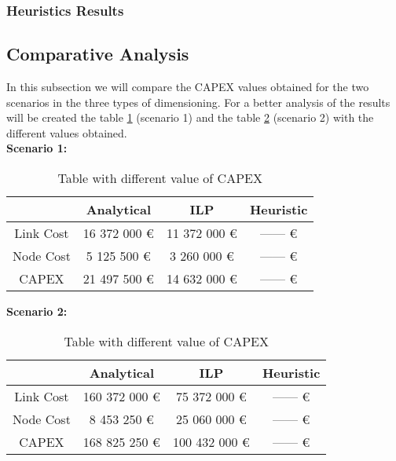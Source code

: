 \subsubsection{Heuristics Results}

\subsection{Comparative Analysis}

In this subsection we will compare the CAPEX values obtained for the two scenarios in the three types of dimensioning. For a better analysis of the results will be created the table \ref{table_comparative_opaque_sur_ref_1} (scenario 1) and the table \ref{table_comparative_opaque_sur_ref_2} (scenario 2) with the different values obtained.\\

\textbf{Scenario 1:}

\begin{table}[h!]
\centering
\begin{tabular}{| c | c | c | c |}
 \hline
   & Analytical & ILP & Heuristic \\
 \hline\hline
 Link Cost & 16 372 000 \euro & 11 372 000 \euro & ------ \euro \\
 Node Cost & 5 125 500 \euro & 3 260 000 \euro & ------ \euro \\
 CAPEX & 21 497 500 \euro & 14 632 000 \euro & ------ \euro \\
 \hline
\end{tabular}
\caption{Table with different value of CAPEX }
\label{table_comparative_opaque_sur_ref_1}
\end{table}


\textbf{Scenario 2:}

\begin{table}[h!]
\centering
\begin{tabular}{| c | c | c | c |}
 \hline
   & Analytical & ILP & Heuristic \\
 \hline\hline
 Link Cost & 160 372 000 \euro & 75 372 000 \euro & ------ \euro \\
 Node Cost & 8 453 250 \euro & 25 060 000 \euro & ------ \euro \\
 CAPEX & 168 825 250 \euro & 100 432 000 \euro & ------ \euro \\
 \hline
\end{tabular}
\caption{Table with different value of CAPEX }
\label{table_comparative_opaque_sur_ref_2}
\end{table}







